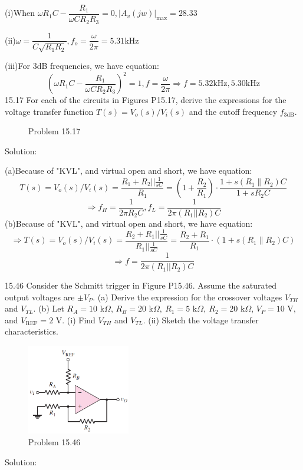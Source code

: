 \documentclass[a4paper,11pt,UTF8]{afthesis}
\begin{document}
(i)When $\omega R_1C-\dfrac{R_1}{\omega CR_2R_3}=0, |A_v(jw)|_{\max}=28.33$

(ii)$\omega =\dfrac{1}{C\sqrt{R_1R_2}}, f_o=\dfrac{\omega}{2\pi}=5.31\mathrm{kHz}$

(iii)For 3dB frequencies, we have equation:
$$(\omega R_1C-\dfrac{R_1}{\omega CR_2R_3})^2=1, f=\frac{\omega}{2\pi}\Rightarrow f= 5.32 \mathrm{kHz}, 5.30 \mathrm{kHz}$$
15.17 For each of the circuits in Figures P15.17, derive the expressions for the voltage transfer function $T(s)=V_o(s)/V_i(s)$ and the cutoff frequency $f_{3\text{dB}}.$
\begin{figure}[H]
	\centering

	\caption{Problem 15.17}
\end{figure}
\noindent Solution:

(a)Because of "KVL", and virtual open and short, we have equation:
$$
	T(s)=V_o(s)/V_i(s)=\frac{R_1+R_2||\frac1{sC}}{R_1}=\left(1+\frac{R_{2}}{R_{1}}\right)\cdot\frac{1+s(R_{1}\parallel R_{2})C}{1+sR_{2}C}
$$
$$
	\Rightarrow f_H=\frac{1}{2\pi R_2C}, f_L=\frac{1}{2\pi (R_1||R_2)C}
$$
(b)Because of "KVL", and virtual open and short, we have equation:
$$
\Rightarrow T(s)=V_o(s)/V_i(s)=\frac{R_2+R_1||\frac1{sC}}{R_1||\frac1{sC}}=\frac{R_{2}+R_{1}}{R_{1}}\cdot\left(1+s(R_{1}\parallel R_{2})C\right)
$$
$$
	\Rightarrow f=\frac{1}{2\pi (R_1||R_2)C}
$$

15.46 Consider the Schmitt trigger in Figure P15.46. Assume the saturated output voltages are $\pm V_P.$ (a) Derive the expression for the crossover voltages $V_{TH}$ and $V_{TL}$. (b) Let $R_A=10$ k$\Omega$, $R_B=20$ k$\Omega,\:R_1=5$ k$\Omega,\:R_2=20$ k$\Omega$, $V_P=10$ V, and $V_{\mathrm{REF}}=2$ V. (i) Find $V_{TH}$ and $V_{TL}$. (ii) Sketch the voltage transfer characteristics.
\begin{figure}[H]
	\centering
	\includegraphics[width=0.4\textwidth]{15.46}
	\caption{Problem 15.46}
\end{figure}
\noindent Solution:
\end{document}
